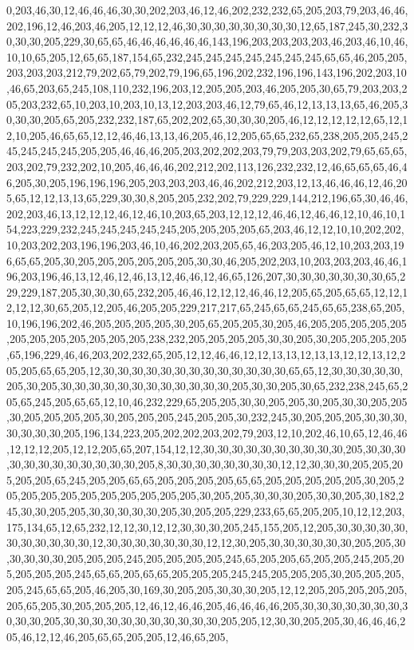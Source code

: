 0,203,46,30,12,46,46,46,30,30,202,203,46,12,46,202,232,232,65,205,203,79,203,46,46,202,196,12,46,203,46,205,12,12,12,46,30,30,30,30,30,30,30,30,12,65,187,245,30,232,30,30,30,205,229,30,65,65,46,46,46,46,46,46,143,196,203,203,203,203,46,203,46,10,46,10,10,65,205,12,65,65,187,154,65,232,245,245,245,245,245,245,245,65,65,46,205,205,203,203,203,212,79,202,65,79,202,79,196,65,196,202,232,196,196,143,196,202,203,10,46,65,203,65,245,108,110,232,196,203,12,205,205,203,46,205,205,30,65,79,203,203,205,203,232,65,10,203,10,203,10,13,12,203,203,46,12,79,65,46,12,13,13,13,65,46,205,30,30,30,205,65,205,232,232,187,65,202,202,65,30,30,30,205,46,12,12,12,12,12,65,12,12,10,205,46,65,65,12,12,46,46,13,13,46,205,46,12,205,65,65,232,65,238,205,205,245,245,245,245,245,205,205,46,46,46,205,203,202,202,203,79,79,203,203,202,79,65,65,65,203,202,79,232,202,10,205,46,46,46,202,212,202,113,126,232,232,12,46,65,65,65,46,46,205,30,205,196,196,196,205,203,203,203,46,46,202,212,203,12,13,46,46,46,12,46,205,65,12,12,13,13,65,229,30,30,8,205,205,232,202,79,229,229,144,212,196,65,30,46,46,202,203,46,13,12,12,12,46,12,46,10,203,65,203,12,12,12,46,46,12,46,46,12,10,46,10,154,223,229,232,245,245,245,245,245,205,205,205,205,65,203,46,12,12,10,10,202,202,10,203,202,203,196,196,203,46,10,46,202,203,205,65,46,203,205,46,12,10,203,203,196,65,65,205,30,205,205,205,205,205,205,30,30,46,205,202,203,10,203,203,203,46,46,196,203,196,46,13,12,46,12,46,13,12,46,46,12,46,65,126,207,30,30,30,30,30,30,30,65,229,229,187,205,30,30,30,65,232,205,46,46,12,12,12,46,46,12,205,65,205,65,65,12,12,12,12,12,30,65,205,12,205,46,205,205,229,217,217,65,245,65,65,245,65,65,238,65,205,10,196,196,202,46,205,205,205,205,30,205,65,205,205,30,205,46,205,205,205,205,205,205,205,205,205,205,205,205,238,232,205,205,205,205,30,30,205,30,205,205,205,205,65,196,229,46,46,203,202,232,65,205,12,12,46,46,12,12,13,13,12,13,13,12,12,13,12,205,205,65,65,205,12,30,30,30,30,30,30,30,30,30,30,30,30,30,65,65,12,30,30,30,30,30,205,30,205,30,30,30,30,30,30,30,30,30,30,30,30,205,30,30,205,30,65,232,238,245,65,205,65,245,205,65,65,12,10,46,232,229,65,205,205,30,30,205,205,30,205,30,30,205,205,30,205,205,205,205,30,205,205,205,245,205,205,30,232,245,30,205,205,205,30,30,30,30,30,30,30,205,196,134,223,205,202,202,203,202,79,203,12,10,202,46,10,65,12,46,46,12,12,12,205,12,12,205,65,207,154,12,12,30,30,30,30,30,30,30,30,30,30,205,30,30,30,30,30,30,30,30,30,30,30,30,205,8,30,30,30,30,30,30,30,30,12,12,30,30,30,205,205,205,205,205,65,245,205,205,65,65,205,205,205,205,65,65,205,205,205,205,205,30,205,205,205,205,205,205,205,205,205,205,205,30,205,205,30,30,30,205,30,30,205,30,182,245,30,30,205,205,30,30,30,30,30,205,30,205,205,229,233,65,65,205,205,10,12,12,203,175,134,65,12,65,232,12,12,30,12,12,30,30,30,205,245,155,205,12,205,30,30,30,30,30,30,30,30,30,30,30,12,30,30,30,30,30,30,30,12,12,30,205,30,30,30,30,30,30,205,205,30,30,30,30,30,205,205,205,245,205,205,205,205,245,65,205,205,65,205,205,245,205,205,205,205,205,245,65,65,205,65,65,205,205,205,245,245,205,205,205,30,205,205,205,205,245,65,65,205,46,205,30,169,30,205,205,30,30,30,205,12,12,205,205,205,205,205,205,65,205,30,205,205,205,12,46,12,46,46,205,46,46,46,46,205,30,30,30,30,30,30,30,30,30,30,205,30,30,30,30,30,30,30,30,30,30,30,205,205,12,30,30,205,205,30,46,46,46,205,46,12,12,46,205,65,65,205,205,12,46,65,205,